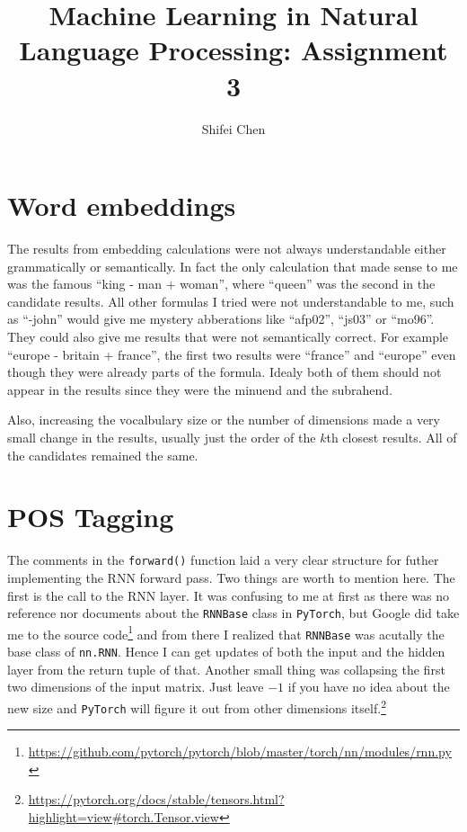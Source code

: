 \documentclass[11pt]{article} %
\title{{\LARGE Machine Learning in Natural Language Processing: \newline Assignment 3}\\[1.5mm]} %
\author{Shifei Chen} %
\begin{document}
\maketitle

\section{Word embeddings}

The results from embedding calculations were not always understandable either grammatically or semantically. In fact the only calculation that made sense to me was the famous ``king - man + woman'', where ``queen'' was the second in the candidate results. All other formulas I tried were not understandable to me, such as ``-john'' would give me mystery abberations like ``afp02'', ``js03'' or ``mo96''. They could also give me results that were not semantically correct. For example ``europe - britain + france'', the first two results were ``france'' and ``europe'' even though they were already parts of the formula. Idealy both of them should not appear in the results since they were the minuend and the subrahend.

Also, increasing the vocalbulary size or the number of dimensions made a very small change in the results, usually just the order of the $k$th closest results. All of the candidates remained the same.

\section{POS Tagging}

The comments in the \verb|forward()| function laid a very clear structure for futher implementing the RNN forward pass. Two things are worth to mention here. The first is the call to the RNN layer. It was confusing to me at first as there was no reference nor documents about the \verb|RNNBase| class in \verb|PyTorch|, but Google did take me to the source code\footnote{\url{https://github.com/pytorch/pytorch/blob/master/torch/nn/modules/rnn.py}} and from there I realized that \verb|RNNBase| was acutally the base class of \verb|nn.RNN|. Hence I can get updates of both the input and the hidden layer from the return tuple of that. Another small thing was collapsing the first two dimensions of the input matrix. Just leave $-1$ if you have no idea about the new size and \verb|PyTorch| will figure it out from other dimensions itself.\footnote{\url{https://pytorch.org/docs/stable/tensors.html?highlight=view#torch.Tensor.view}}
\end{document}
